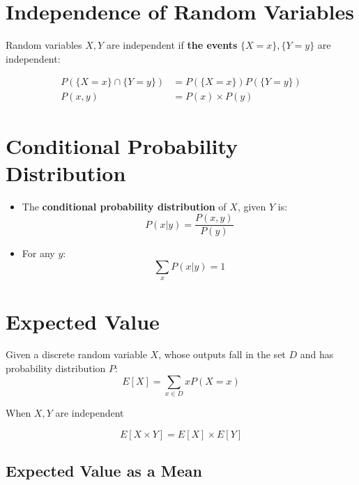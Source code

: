 \section{Independence of Random Variables}

  Random variables $ X, Y $ are independent if \textbf{the events} $ \{ X = x \}, \{ Y = y \} $ are independent:
  
  \begin{align}
    P(\{ X = x \} \cap \{ Y = y \}) &= P(\{ X = x \}) P(\{ Y = y \}) \\
    P(x,y) &= P(x) \times P(y)
  \end{align}
  
\section{Conditional Probability Distribution}

  \begin{itemize}
    \item The \textbf{conditional probability distribution} of $ X $, given $ Y $ is:
    \begin{equation}
      P(x | y) = \frac{ P(x, y) }{ P(y) }
    \end{equation}
  
    \item For any $ y $:
    \begin{equation}
      \sum_{x} P(x | y) = 1
    \end{equation}
  \end{itemize}
  
\section{Expected Value}

  Given a discrete random variable $ X $, whose outputs fall in the set $ D $ and has probability distribution $ P $:  
  \begin{equation}
    E \left[ X \right] = \sum_{x \in D} x P \left( X = x \right)
  \end{equation}
  
  When $ X, Y $ are independent
  
  \begin{equation}\label{eq-expected-values-of-independent-variables}
    E \left[ X \times Y \right] = E \left[ X \right] \times E \left[ Y \right]
  \end{equation}
  
  \subsection{Expected Value as a Mean}
  
